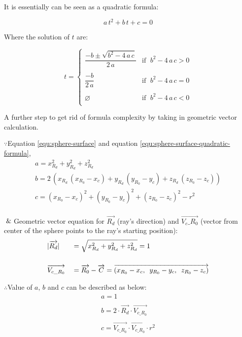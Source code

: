 It is essentially can be seen as a quadratic formula:

\begin{equation}
\label{equ:sphere-surface-quadratic-formula}
a\,t^2 + b\,t + c = 0
\end{equation}

Where the solution of $t$ are:

\begin{equation}
\label{equ:sphere-t-solution}
t =
\begin{cases}
\dfrac{-b \pm \sqrt{b^2 - 4\,a\,c}}{2\,a} & \text{if }\;b^2 - 4\,a\,c > 0\\\\
\dfrac{-b}{2\,a} & \text{if }\; b^2 - 4\,a\,c = 0\\\\
\varnothing & \text{if }\; b^2 - 4\,a\,c < 0\\
\end{cases}
\end{equation}

A further step to get rid of formula complexity by taking in geometric vector calculation.

$\because$\;\;\;\;Equation \ref{equ:sphere-surface} and equation \ref{equ:sphere-surface-quadratic-formula},
\[
\begin{array}{lr}
a = x_{R_d}^2 + y_{R_d}^2 + z_{R_d}^2\\
b = 2\,(x_{R_d}\,(x_{R_0} - x_c) + y_{R_d}\,(y_{R_0} - y_c) + z_{R_d}\,(z_{R_0} - z_c))\\
c = (x_{R_0} - x_c)^2 + (y_{R_0} - y_c)^2 + (z_{R_0} - z_c)^2 - r^2\\
\end{array}
\]

$\And$\;\;\;\;Geometric vector equation for $\overrightarrow{R_d}$ (ray's direction) and $\overrightarrow{V_c\_R_0}$ (vector from center of the sphere points to the ray's starting position):
\[
\begin{array}{lr}
\begin{aligned}
&\lvert \overrightarrow{R_d} \rvert &&= \sqrt{x_{R_d}^2 + y_{R_d}^2 + z_{R_d}^2} = 1\\\\
&\overrightarrow{V_{c\_R_0}} &&= \overrightarrow{R_0} - \overrightarrow{C} = \overrightarrow{(x_{R_0} - x_c,\enspace y_{R_0} - y_c,\enspace z_{R_0} - z_c)}\\
\end{aligned}
\end{array}
\]

$\therefore$\;\;\;\;Value of $a$, $b$ and $c$ can be described as below:
\[
\begin{array}{lr}
a =1\\\\
b = 2 \cdot \overrightarrow{R_d} \cdot \overrightarrow{V_{c\_R_0}}\\\\
c = \overrightarrow{V_{c\_R_0}} \cdot \overrightarrow{V_{c\_R_0}} \cdot r^2\\
\end{array}
\]

